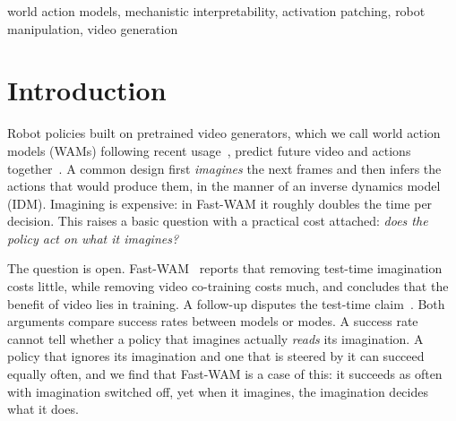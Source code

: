 \documentclass[conference]{IEEEtran}
\begin{document}
\begin{IEEEkeywords}
world action models, mechanistic interpretability, activation patching, robot manipulation, video generation
\end{IEEEkeywords}

\section{Introduction}

Robot policies built on pretrained video generators, which we call world action models (WAMs) following recent
usage~\cite{ye2026dreamzero,yuan2026fastwam}, predict future video and actions
together~\cite{du2023unipi,wu2023gr1,tian2024seer,ye2026dreamzero,bi2026motus2}. A common design first
\emph{imagines} the next frames and then infers the actions that would produce them, in the manner of an inverse
dynamics model (IDM). Imagining is expensive: in Fast-WAM it roughly doubles the time per decision. This raises a basic question with a
practical cost attached: \emph{does the policy act on what it imagines?}

The question is open. Fast-WAM~\cite{yuan2026fastwam} reports that removing test-time imagination costs little,
while removing video co-training costs much, and concludes that the benefit of video lies in training. A follow-up
disputes the test-time claim~\cite{li2026lawa}. Both arguments compare success rates between models or modes. A
success rate cannot tell whether a policy that imagines actually \emph{reads} its imagination. A policy that ignores its
imagination and one that is steered by it can succeed equally often, and we find that Fast-WAM is a case of this:
it succeeds as often with imagination switched off, yet when it imagines, the imagination decides what it does.
\end{document}
